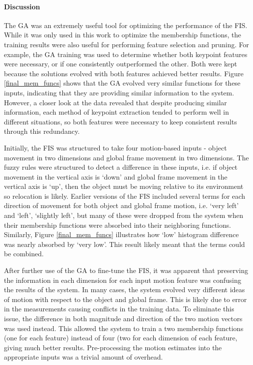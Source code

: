 \documentclass[12pt]{report}
\begin{document}
\paragraph{Discussion}
The GA was an extremely useful tool for optimizing the performance of the FIS. While it was only used in this work to optimize the membership functions, the training results were also useful for performing feature selection and pruning. For example, the GA training was used to determine whether both keypoint features were necessary, or if one consistently outperformed the other. Both were kept because the solutions evolved with both features achieved better results. Figure \ref{final_mem_funcs} shows that the GA evolved very similar functions for these inputs, indicating that they are providing similar information to the system. However, a closer look at the data revealed that despite producing similar information, each method of keypoint extraction tended to perform well in different situations, so both features were necessary to keep consistent results through this redundancy.

Initially, the FIS was structured to take four motion-based inputs - object movement in two dimensions and global frame movement in two dimensions. The fuzzy rules were structured to detect a difference in these inputs, i.e. if object movement in the vertical axis is `down' and global frame movement in the vertical axis is `up', then the object must be moving relative to its environment so relocation is likely. Earlier versions of the FIS included several terms for each direction of movement for both object and global frame motion, i.e. `very left' and `left', `slightly left', but many of these were dropped from the system when their membership functions were absorbed into their neighboring functions. Similarly, Figure \ref{final_mem_funcs} illustrates how `low' histogram difference was nearly absorbed by `very low'. This result likely meant that the terms could be combined.

After further use of the GA to fine-tune the FIS, it was apparent that preserving the information in each dimension for each input motion feature was confusing the results of the system. In many cases, the system evolved very different ideas of motion with respect to the object and global frame. This is likely due to error in the measurements causing conflicts in the training data. To eliminate this issue, the difference in both magnitude and direction of the two motion vectors was used instead. This allowed the system to train a two membership functions (one for each feature) instead of four (two for each dimension of each feature, giving much better results. Pre-processing the motion estimates into the appropriate inputs was a trivial amount of overhead.
\end{document}
